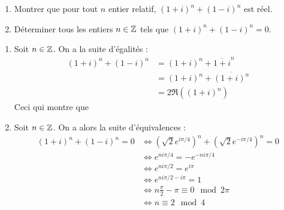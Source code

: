 \begin{exo}
\begin{enumerate}
\item Montrer que pour tout $n$ entier relatif, $(1+i)^n+(1-i)^n$ est réel.
\item Déterminer tous les entiers $n\in \mathbb{Z}$ tels que $(1+i)^n+(1-i)^n=0$.
\end{enumerate}
\begin{sol}
\begin{enumerate}
\item Soit $n\in \mathbb{Z}$. On a la suite d'égalités :
\begin{align*}
(1+i)^n+(1-i)^n 
&= (1+i)^n+\overline{1+i}^n\\
&= (1+i)^n+\overline{(1+i)^n}\\
&= 2 \Re\left((1+i)^n\right)
\end{align*}
Ceci qui montre que 
\item Soit $n\in \mathbb{Z}$. On a alors la suite d'équivalences :
\begin{align*}
(1+i)^n+(1-i)^n =0
&\iff \left(\sqrt 2 e^{i\pi/4}\right)^n+\left(\sqrt 2 e^{-i\pi/4}\right)^n=0\\
&\iff e^{ni\pi/4}=-e^{-ni\pi/4}\\
&\iff e^{ni\pi/2}=e^{i\pi}\\
&\iff e^{ni\pi/2 - i\pi}=1\\
&\iff n\frac{\pi}{2}-\pi \equiv 0 \mod 2\pi\\
&\iff \boxed{n\equiv 2 \mod 4}
\end{align*}
\end{enumerate}
\end{sol}
\end{exo}


